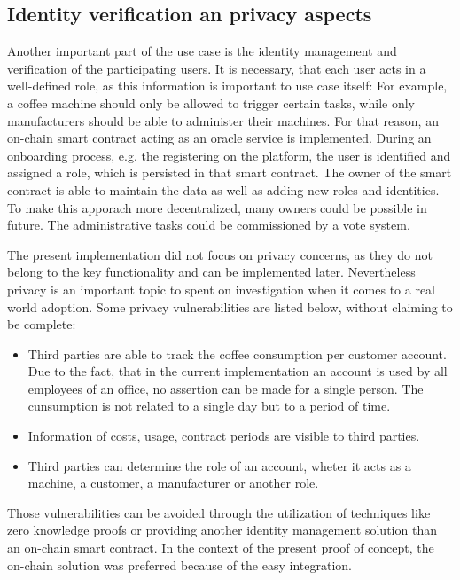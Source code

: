 \documentclass[conference]{IEEEtran}
\begin{document}
\subsection{Identity verification an privacy aspects}
Another important part of the use case is the identity management and verification of the participating users. It is necessary, that each user acts in a well-defined role, as this information is important to use case itself: For example, a coffee machine should only be allowed to trigger certain tasks, while only manufacturers should be able to administer their machines. For that reason, an on-chain smart contract acting as an oracle service is implemented. During an onboarding process, e.g. the registering on the platform, the user is identified and assigned a role, which is persisted in that smart contract. The owner of the smart contract is able to maintain the data as well as adding new roles and identities. To make this apporach more decentralized, many owners could be possible in future. The administrative tasks could be commissioned by a vote system.

The present implementation did not focus on privacy concerns, as they do not belong to the key functionality and can be implemented later. Nevertheless privacy is an important topic to spent on investigation when it comes to a real world adoption. Some privacy vulnerabilities are listed below, without claiming to be complete:

\begin{itemize}
  \item Third parties are able to track the coffee consumption per customer account. Due to the fact, that in the current implementation an account is used by all employees of an office, no assertion can be made for a single person. The cunsumption is not related to a single day but to a period of time.
  \item Information of costs, usage, contract periods are visible to third parties.
  \item Third parties can determine the role of an account, wheter it acts as a machine, a customer, a manufacturer or another role.
\end{itemize}
Those vulnerabilities can be avoided through the utilization of techniques like zero knowledge proofs \cite{XYZ} or providing another identity management solution than an on-chain smart contract. In the context of the present proof of concept, the on-chain solution was preferred because of the easy integration.
\end{document}
